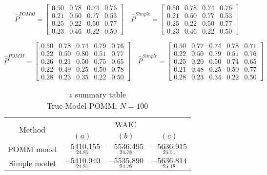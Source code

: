 \documentclass[11pt]{amsart}
\begin{document}
$$\hat{P}^{POMM}=\left[\begin{array}{cccc}0.50 & 0.78 & 0.74 & 0.76 \\
0.21 & 0.50& 0.77 & 0.53 \\
0.25 & 0.22 & 0.50 & 0.77 \\
0.23 & 0.46 & 0.22 & 0.50 \end{array}\right] \quad \hat{P}^{Simple}=\left[\begin{array}{cccc}0.50 & 0.78 & 0.74 & 0.76 \\
0.21& 0.50 & 0.77 & 0.53 \\
0.25 & 0.22 & 0.50 & 0.77 \\
0.23 & 0.46 & 0.22 & 0.50\end{array}\right]
$$

$$
\hat{P}^{POMM}= \left[\begin{array}{ccccc}0.50& 0.78 & 0.74 & 0.79 & 0.76 \\
0.22 & 0.50 & 0.80 & 0.51 & 0.77 \\
0.26 & 0.21& 0.50& 0.75 & 0.65 \\
0.22& 0.49 & 0.25& 0.50 & 0.78 \\
0.28& 0.23 & 0.35 & 0.22 & 0.50\end{array}\right] \quad \hat{P}^{Simple}= \left[\begin{array}{ccccc}0.50& 0.77 & 0.74 & 0.78 & 0.71 \\
0.22 & 0.50& 0.79 & 0.51 & 0.76 \\
0.25& 0.20 & 0.50 & 0.74& 0.65 \\
0.21& 0.48 & 0.25 & 0.50 & 0.77 \\
0.28& 0.23 & 0.34 & 0.22& 0.50\end{array}\right]
$$





\begin{table}[htbp]
\centering
\caption*{
{\large $z$ summary table} \\ 
{\small True Model POMM, $N=100$}
} 
\begin{tabular}{cccc}
\toprule
\multirow{2}{*}{Method}  &\multicolumn{3}{c}{WAIC} \\
\cmidrule(lr){2-4}
& $(a)$ & $(b)$ & $(c)$  \\
\midrule
POMM model  &$\underset{24.85}{-5410.155}$ & $\underset{24.78}{-5536.495}$ & $\underset{25.51}{-5636.915}$  \\
Simple model  &$\underset{24.87}{-5410.940}$ & $\underset{24.76}{-5535.890}$ & $\underset{25.48}{-5636.814}$ \\
\bottomrule
\end{tabular}
\label{table:simulations_from_simple}
\end{table}
\end{document}
